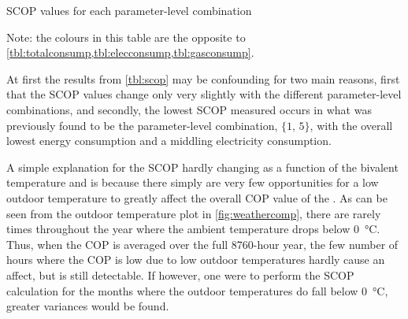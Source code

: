 \begin{table}[htb]
    \centering
    \begin{threeparttable}
    \footnotesize
    \centering
    \caption{\acs{SCOP} values for each parameter-level combination}
    \label{tbl:scop}
    \begin{tablenotes}
        \small
        \item Note: the colours in this table are the opposite to \cref{tbl:totalconsump,tbl:elecconsump,tbl:gasconsump}. 
      \end{tablenotes}
    \end{threeparttable}
\end{table}

At first the results from \cref{tbl:scop} may be confounding for two main reasons, first that the \ac{SCOP} values change only very slightly with the different parameter-level combinations, and secondly, the lowest \ac{SCOP} measured occurs in what was previously found to be the parameter-level combination, $\{1\text{, }5\}$, with the overall lowest energy consumption and a middling electricity consumption.

A simple explanation for the \ac{SCOP} hardly changing as a function of the bivalent temperature and is because there simply are very few opportunities for a low outdoor temperature to greatly affect the overall \ac{COP} value of the \HP. As can be seen from the outdoor temperature plot in \cref{fig:weathercomp}, there are rarely times throughout the year where the ambient temperature drops below \qty{0}{\celsius}. Thus, when the \ac{COP} is averaged over the full 8760-hour year, the few number of hours where the \ac{COP} is low due to low outdoor temperatures hardly cause an affect, but is still detectable. If however, one were to perform the \ac{SCOP} calculation for the months where the outdoor temperatures do fall below \qty{0}{\celsius}, greater variances would be found. 

